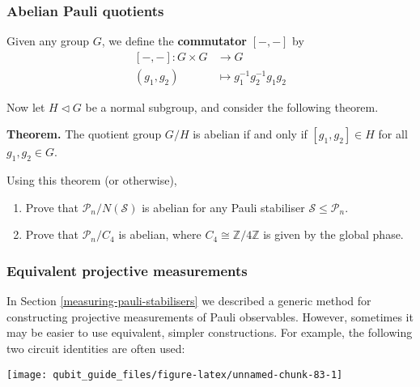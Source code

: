 \documentclass[fleqn]{article}
\providecommand{\tightlist}{%
  \setlength{\itemsep}{0pt}\setlength{\parskip}{0pt}}
\newenvironment{idea}{\noindent}{\medskip}
\begin{document}
\hypertarget{pauli-mod-normaliser-is-abelian}{%
\subsubsection{Abelian Pauli quotients}\label{pauli-mod-normaliser-is-abelian}}

Given any group \(G\), we define the \textbf{commutator} \([-,-]\) by
\[
  \begin{aligned}
    [-,-]\colon G\times G
    &\longrightarrow G
  \\(g_1,g_2)
    &\longmapsto g_1^{-1}g_2^{-1}g_1g_2
  \end{aligned}
\]

Now let \(H\triangleleft G\) be a normal subgroup, and consider the following theorem.

\begin{idea}
\textbf{Theorem.} The quotient group \(G/H\) is abelian if and only if \([g_1,g_2]\in H\) for all \(g_1,g_2\in G\).

\end{idea}

Using this theorem (or otherwise),

\begin{enumerate}
\def\labelenumi{\arabic{enumi}.}
\tightlist
\item
  Prove that \(\mathcal{P}_n/N(\mathcal{S})\) is abelian for any Pauli stabiliser \(\mathcal{S}\leqslant\mathcal{P}_n\).
\item
  Prove that \(\mathcal{P}_n/C_4\) is abelian, where \(C_4\cong\mathbb{Z}/4\mathbb{Z}\) is given by the global phase.
\end{enumerate}

\hypertarget{equivalent-projective-pauli-measurements}{%
\subsubsection{Equivalent projective measurements}\label{equivalent-projective-pauli-measurements}}

In Section \ref{measuring-pauli-stabilisers} we described a generic method for constructing projective measurements of Pauli observables.
However, sometimes it may be easier to use equivalent, simpler constructions.
For example, the following two circuit identities are often used:

\begin{center}\texttt{[image: qubit\_guide\_files/figure-latex/unnamed-chunk-83-1]} \end{center}
\end{document}
